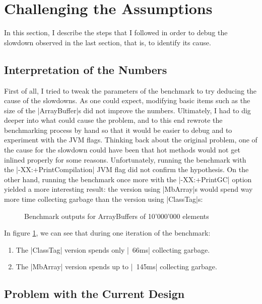 
\section{Challenging the Assumptions}

In this section, I describe the steps that I followed in order to debug the slowdown observed in the last section, that is, to identify its cause.

\subsection{Interpretation of the Numbers}

First of all, I tried to tweak the parameters of the benchmark to try deducing the cause of the slowdowns. As one could expect, modifying basic items such as the size of the |ArrayBuffer|s did not improve the numbers. Ultimately, I had to dig deeper into what could cause the problem, and to this end rewrote the benchmarking process by hand so that it would be easier to debug and to experiment with the JVM flags. Thinking back about the original problem, one of the cause for the slowdown could have been that hot methods would not get inlined properly for some reasons. Unfortunately, running the benchmark with the |-XX:+PrintCompilation| JVM flag did not confirm the hypothesis. On the other hand, running the benchmark once more with the |-XX:+PrintGC| option yielded a more interesting result: the version using |MbArray|s would spend way more time collecting garbage than the version using |ClassTag|s:

\begin{figure}
\caption{Benchmark outputs for ArrayBuffers of 10'000'000 elements}
\label{fig:GcComp}
\end{figure}

In figure \ref{fig:GcComp}, we can see that during one iteration of the benchmark:
\begin{enumerate}
  \item The |ClassTag| version spends only |~66ms| collecting garbage.
  \item The |MbArray| version spends up to |~145ms| collecting garbage. 
\end{enumerate} 

\subsection{Problem with the Current Design}

